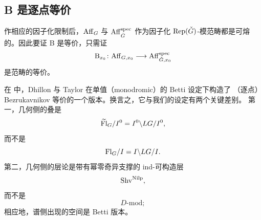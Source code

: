 \subsection{B 是逐点等价}
\label{sec:b-pointwise}

作相应的因子化限制后，$\mathrm{Aff}_G$ 与 $\mathrm{Aff}^{\mathrm{spec}}_{\check G}$ 作为因子化
$\mathrm{Rep}(\check G)$-模范畴都是可熔的。因此要证 B 是等价，只需证
\[
\mathrm{B}_{x_0}\colon
\mathrm{Aff}_{G,x_0}\longrightarrow \mathrm{Aff}^{\mathrm{spec}}_{\check G,x_0}
\]
是范畴的等价。

在 \cite{DT25} 中，Dhillon 与 Taylor 在单值（monodromic）的 Betti 设定下构造了
（逐点）Bezrukavnikov 等价的一个版本。换言之，它与我们的设定有两个关键差别。
第一，几何侧的叠是
\[
\widetilde{\mathrm{Fl}}_G/I^0=I^0\backslash LG/I^0,
\]
而不是
\[
\mathrm{Fl}_G/I=I\backslash LG/I.
\]
第二，几何侧的层论是带有幂零奇异支撑的 ind-可构造层
\[
\mathrm{Shv}^{\mathrm{Nilp}},
\]
而不是
\[
D\text{-}\mathrm{mod};
\]
相应地，谱侧出现的空间是 Betti 版本。

